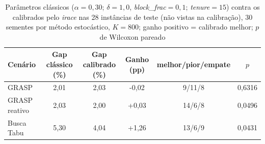 \begin{table}[H]
\centering\singlespacing
\begin{minipage}{\textwidth}
\caption{Parâmetros clássicos ($\alpha{=}0{,}30$; $\delta{=}1{,}0$, \textit{block\_frac}$=0{,}1$; \textit{tenure}$=15$) contra os calibrados pelo \textit{irace} nas 28 instâncias de teste (não vistas na calibração), 30 sementes por método estocástico, $K=800$; ganho positivo = calibrado melhor; $p$ de Wilcoxon pareado}
\label{tab:gain}
\centering
\footnotesize\setlength{\tabcolsep}{4pt}
\begin{tabular}{lccccc}
\toprule
\textbf{Cenário} & \textbf{Gap clássico (\%)} & \textbf{Gap calibrado (\%)} & \textbf{Ganho (pp)} & \textbf{melhor/pior/empate} & $p$ \\
\midrule
GRASP & 2{,}01 & 2{,}03 & -0{,}02 & 9/11/8 & 0{,}6316 \\
GRASP reativo & 2{,}03 & 2{,}00 & +0{,}03 & 14/6/8 & 0{,}0496 \\
Busca Tabu & 5{,}30 & 4{,}04 & +1{,}26 & 13/6/9 & 0{,}0431 \\
\bottomrule
\end{tabular}
\end{minipage}
\end{table}
